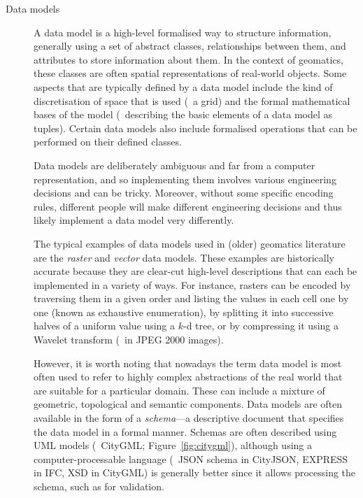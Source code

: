 \begin{description}

\item[Data models]

A data model is a high-level formalised way to structure information, generally using a set of abstract classes, relationships between them, and attributes to store information about them.
In the context of geomatics, these classes are often spatial representations of real-world objects.
Some aspects that are typically defined by a data model include the kind of discretisation of space that is used (\eg\ a grid) and the formal mathematical bases of the model (\eg\ describing the basic elements of a data model as tuples).
Certain data models also include formalised operations that can be performed on their defined classes.

Data models are deliberately ambiguous and far from a computer representation, and so implementing them involves various engineering decisions and can be tricky.
Moreover, without some specific encoding rules, different people will make different engineering decisions and thus likely implement a data model very differently.

The typical examples of data models used in (older) geomatics literature are the \emph{raster} and \emph{vector} data models.
These examples are historically accurate because they are clear-cut high-level descriptions that can each be implemented in a variety of ways.
For instance, rasters can be encoded by traversing them in a given order and listing the values in each cell one by one (known as exhaustive enumeration), by splitting it into successive halves of a uniform value using a $k$-d tree, or by compressing it using a Wavelet transform (\eg\ in JPEG 2000 images).

However, it is worth noting that nowadays the term data model is most often used to refer to highly complex abstractions of the real world that are suitable for a particular domain.
These can include a mixture of geometric, topological and semantic components.
Data models are often available in the form of a \emph{schema}---a descriptive document that specifies the data model in a formal manner.
Schemas are often described using UML models (\eg\ CityGML; Figure~\ref{fig:citygml}), although using a computer-processable language (\eg\ JSON schema in CityJSON, EXPRESS in IFC, XSD in CityGML) is generally better since it allows processing the schema, such as for validation.


\end{description}
